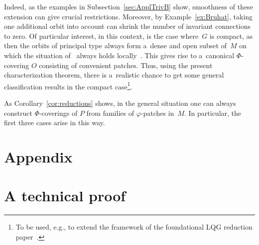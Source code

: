 \documentclass[pdftex]{sigma}
\numberwithin{equation}{section}
\begin{document}
\begin{itemize}
Indeed, as the examples in Subsection~\ref{sec:ApplTrivB} show, smoothness of these extension can give crucial
restrictions.
Moreover, by Example~\ref{ex:Bruhat}, taking one additional orbit into account can shrink the number of invariant
connections to zero.
Of particular interest, in this context, is the case where~$G$ is compact, as then the orbits of principal type always
form a~dense and open subset of~$M$ on which the situation of~\cite{HarSni} always holds locally~\cite{RumSchmBuch}. This gives rise to
a~canonical $\Phi$-covering $O$ consisting of convenient patches.
Thus, using the present characterization theorem, there is a~realistic chance to get some general classif\/ication results in
the compact case\footnote{To be used, e.g., to extend the framework of the foundational LQG reduction
paper~\cite{BojoKa}.}.
\end{itemize}

As Corollary~\ref{cor:reductions} shows, in the general situation one can always construct $\Phi$-coverings of $P$ from families of
$\varphi$-patches in~$M$.
In particular, the f\/irst three cases arise in this way.

\appendix

\section*{Appendix}

\section{A technical proof}\label{sec:STPR}

\end{document}
